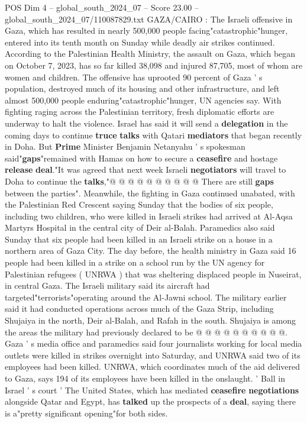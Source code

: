\begin{textsample}{POS Dim 4 – global\_south\_2024\_07 – Score 23.00 – global\_south\_2024\_07/110087829.txt}  \label{ex:f4_pos_116}
GAZA/CAIRO : The Israeli offensive in Gaza, which has resulted in nearly 500,000 people facing"catastrophic"hunger, entered into its tenth month on Sunday while deadly air strikes continued.
According to the Palestinian Health Ministry, the assault on Gaza, which began on October 7, 2023, has so far killed 38,098 and injured 87,705, most of whom are women and children.
The offensive has uprooted 90 percent of Gaza ' s population, destroyed much of its housing and other infrastructure, and left almost 500,000 people enduring"catastrophic"hunger, UN agencies say.
With fighting raging across the Palestinian territory, fresh diplomatic efforts are underway to halt the violence.
Israel has said it will send a \textbf{delegation} in the coming days to continue \textbf{truce} \textbf{talks} with Qatari \textbf{mediators} that began recently in Doha.
But \textbf{Prime} Minister Benjamin Netanyahu ' s spokesman said"\textbf{gaps}"remained with Hamas on how to secure a \textbf{ceasefire} and hostage \textbf{release} \textbf{deal}."It was agreed that next week Israeli \textbf{negotiators} will travel to Doha to continue the \textbf{talks},"@ @ @ @ @ @ @ @ @ @ There are still \textbf{gaps} between the parties".
Meanwhile, the fighting in Gaza continued unabated, with the Palestinian Red Crescent saying Sunday that the bodies of six people, including two children, who were killed in Israeli strikes had arrived at Al-Aqsa Martyrs Hospital in the central city of Deir al-Balah.
Paramedics also said Sunday that six people had been killed in an Israeli strike on a house in a northern area of Gaza City.
The day before, the health ministry in Gaza said 16 people had been killed in a strike on a school run by the UN agency for Palestinian refugees ( UNRWA ) that was sheltering displaced people in Nuseirat, in central Gaza.
The Israeli military said its aircraft had targeted"terrorists"operating around the Al-Jawni school.
The military earlier said it had conducted operations across much of the Gaza Strip, including Shujaiya in the north, Deir al-Balah, and Rafah in the south.
Shujaiya is among the areas the military had previously declared to be @ @ @ @ @ @ @ @ @ @.
Gaza ' s media office and paramedics said four journalists working for local media outlets were killed in strikes overnight into Saturday, and UNRWA said two of its employees had been killed.
UNRWA, which coordinates much of the aid delivered to Gaza, says 194 of its employees have been killed in the onslaught. ' Ball in Israel ' s court ' The United States, which has mediated \textbf{ceasefire} \textbf{negotiations} alongside Qatar and Egypt, has \textbf{talked} up the prospects of a \textbf{deal}, saying there is a"pretty significant opening"for both sides.

\end{textsample}
